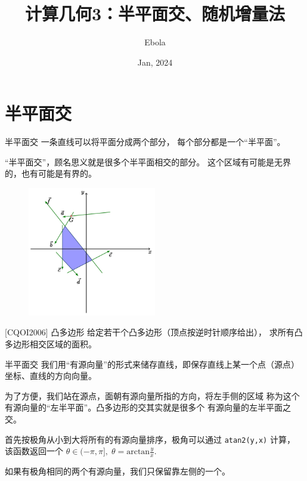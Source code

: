 \documentclass{beamer}
\author{Ebola}
\title{计算几何3：半平面交、随机增量法}
\institute{
    Institute of Mathematics, \\
    Zhejiang University.
}
\date{Jan, 2024}
\begin{document}
\begin{frame}
    \titlepage
\end{frame}

\begin{frame}
    \tableofcontents[sectionstyle=show,subsectionstyle=show/shaded/hide,subsubsectionstyle=show/shaded/hide]
\end{frame}

\section{半平面交}

\begin{frame}{半平面交}
    \small
    一条直线可以将平面分成两个部分，
    每个部分都是一个“半平面”。

    \vspace{1em}
    “半平面交”，顾名思义就是很多个半平面相交的部分。
    这个区域有可能是无界的，也有可能是有界的。

    \begin{figure}[H]
        \centering
        \includegraphics[width=0.5\textwidth]{pic/halfplane_2.png}
    \end{figure}
\end{frame}

\begin{frame}{[CQOI2006] 凸多边形}
    \small
    给定若干个凸多边形（顶点按逆时针顺序给出），
    求所有凸多边形相交区域的面积。

\end{frame}

\begin{frame}[fragile]{半平面交}
    \small
    我们用“有源向量”的形式来储存直线，即保存直线上某一个点（源点）坐标、直线的方向向量。

    \vspace{1em}
    为了方便，我们站在源点，面朝有源向量所指的方向，将左手侧的区域
    称为这个有源向量的“左半平面”。凸多边形的交其实就是很多个
    有源向量的左半平面之交。

    \vspace{1em}
    首先按极角从小到大将所有的有源向量排序，极角可以通过 \verb|atan2(y,x)| 计算，
    该函数返回一个 $\theta\in(-\pi,\pi],\;\theta=\text{arctan}\frac{y}{x}$.

    如果有极角相同的两个有源向量，我们只保留靠左侧的一个。
\end{frame}
\end{document}
